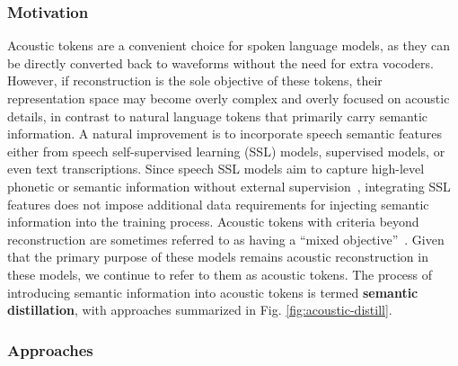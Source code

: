 \subsubsection{Motivation}
Acoustic tokens are a convenient choice for spoken language models, as they can be directly converted back to waveforms without the need for extra vocoders.
However, if reconstruction is the sole objective of these tokens, their representation space may become overly complex and overly focused on acoustic details, in contrast to natural language tokens that primarily carry semantic information.
A natural improvement is to incorporate speech semantic features either from speech self-supervised learning (SSL) models, supervised models, or even text transcriptions.
Since speech SSL models aim to capture high-level phonetic or semantic information without external supervision~\cite{mohamed2022self}, integrating SSL features does not impose additional data requirements for injecting semantic information into the training process. 
Acoustic tokens with criteria beyond reconstruction are sometimes referred to as having a ``mixed objective''~\cite{cui2024recent}.
Given that the primary purpose of these models remains acoustic reconstruction in these models, we continue to refer to them as acoustic tokens.
The process of introducing semantic information into acoustic tokens is termed \textbf{semantic distillation}, with approaches summarized in Fig. \ref{fig:acoustic-distill}.

\subsubsection{Approaches}

